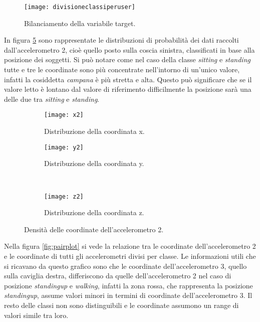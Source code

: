 \begin{figure}[h]
    \centering\texttt{[image: divisioneclassiperuser]}
    \caption{Bilanciamento della variabile target.}
    \label{fig:classiusers}
\end{figure}

In figura \ref{fig:kde} sono rappresentate le distribuzioni di probabilità dei dati raccolti dall'accelerometro 2, cioè quello posto sulla coscia sinistra, classificati in base alla posizione dei soggetti. Si può notare come nel caso della classe \textit{sitting} e \textit{standing} tutte e tre le coordinate sono più concentrate nell'intorno di un'unico valore, infatti la cosiddetta \textit{campana} è più stretta e alta. Questo può significare che se il valore letto è lontano dal valore di riferimento difficilmente la posizione sarà una delle due tra \textit{sitting} e \textit{standing}.

\begin{figure}[h]
    \centering
    \begin{subfigure}[t]{0.4\textwidth}
        \centering\texttt{[image: x2]}
        \caption{Distribuzione della coordinata x.}
        \label{fig:kde:x2}
    \end{subfigure}
    \begin{subfigure}[t]{0.4\textwidth}
        \centering\texttt{[image: y2]}
        \caption{Distribuzione della coordinata y.}
        \label{fig:kde:y2}
    \end{subfigure}
    \\
    \begin{subfigure}[t]{0.4\textwidth}
        \centering\texttt{[image: z2]}
        \caption{Distribuzione della coordinata z.}
        \label{fig:kde:z2}
    \end{subfigure}
    \caption{Densità delle coordinate dell'accelerometro 2.}
    \label{fig:kde}
\end{figure}

Nella figura \ref{fig:pairplot} si vede la relazione tra le coordinate dell'accelerometro 2 e le coordinate di tutti gli accelerometri divisi per classe. Le informazioni utili che si ricavano da questo grafico sono che le coordinate dell'accelerometro 3, quello sulla caviglia destra, differiscono da quelle dell'accelerometro 2 nel caso di posizione \textit{standingup} e \textit{walking}, infatti la zona rossa, che rappresenta la posizione \textit{standingup}, assume valori minori in termini di coordinate dell'accelerometro 3. Il resto delle classi non sono distinguibili e le coordinate assumono un range di valori simile tra loro.

